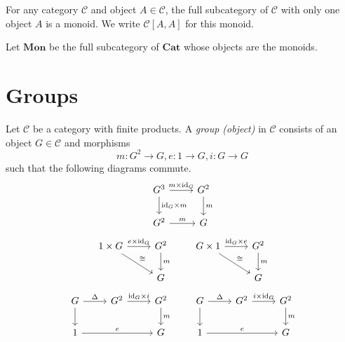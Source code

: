\begin{ex}
For any category $\mathcal{C}$ and object $A \in \mathcal{C}$, the full subcategory of $\mathcal{C}$ with only one object $A$ is a monoid. We write $\mathcal{C}[A,A]$ for this monoid.
\end{ex}

\begin{df}
Let $\mathbf{Mon}$ be the full subcategory of $\mathbf{Cat}$ whose objects are the monoids.
\end{df}

\chapter{Groups}

\begin{df}[Group]
Let $\mathcal{C}$ be a category with finite products. A \emph{group (object)} in $\mathcal{C}$ consists of an object $G \in \mathcal{C}$ and morphisms
\[ m : G^2 \rightarrow G, e : 1 \rightarrow G, i : G \rightarrow G \]
such that the following diagrams commute.
\[ \begin{tikzcd}
G^3 \arrow[r,"m \times \id{G}"] \arrow[d,"\id{G} \times m"] & G^2 \arrow[d,"m"] \\
G^2 \arrow[r,"m"] & G
\end{tikzcd} \]
\[ \begin{tikzcd}
1 \times G \arrow[r,"e \times \id{G}"] \arrow[dr,"\cong"] & G^2 \arrow[d,"m"] \\
& G
\end{tikzcd}
\qquad
\begin{tikzcd}
G \times 1 \arrow[r,"\id{G} \times e"] \arrow[dr,"\cong"] & G^2 \arrow[d,"m"] \\
& G
\end{tikzcd} \]
\[ \begin{tikzcd}
G \arrow[r,"\Delta"] \arrow[d] & G^2 \arrow[r,"\id{G} \times i"] & G^2 \arrow[d,"m"] \\
1 \arrow[rr,"e"] & & G
\end{tikzcd}
\qquad
\begin{tikzcd}
G \arrow[r,"\Delta"] \arrow[d] & G^2 \arrow[r,"i \times \id{G}"] & G^2 \arrow[d,"m"] \\
1 \arrow[rr,"e"] & & G
\end{tikzcd} \]
\end{df}

